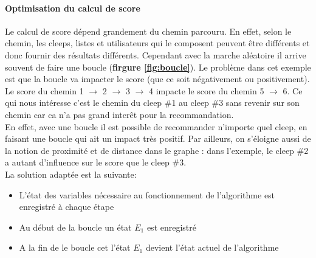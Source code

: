 \documentclass{article} %
\begin{document}
\paragraph{Optimisation du calcul de score\\}
Le calcul de score dépend grandement du chemin parcouru. En effet, selon le chemin, les cleeps, listes et utilisateurs qui le composent peuvent être différents et donc fournir des résultats différents. Cependant avec la marche aléatoire il arrive souvent de faire une boucle (\textbf{firgure \ref{fig:boucle}}). Le problème dans cet exemple est que la boucle va impacter le score (que ce soit négativement ou positivement). Le score du chemin 1 $\rightarrow$ 2 $\rightarrow$ 3 $\rightarrow$ 4 impacte le score du chemin 5 $\rightarrow$ 6. Ce qui nous intéresse c'est le chemin du cleep \#1 au cleep \#3 sans revenir sur son chemin car ca n'a pas grand interêt pour la recommandation.\\
En effet, avec une boucle il est possible de recommander n'importe quel cleep, en faisant une boucle qui ait un impact très positif. Par ailleurs, on s'éloigne aussi de la notion de proximité et de distance dans le graphe : dans l'exemple, le cleep \#2 a autant d'influence sur le score que le cleep \#3.\\
La solution adaptée est la suivante:
\begin{itemize}
	\item L'état des variables nécessaire au fonctionnement de l'algorithme est enregistré à chaque étape
	\item Au début de la boucle un état $E_{1}$ est enregistré
	\item A la fin de le boucle cet l'état $E_{1}$ devient l'état actuel de l'algorithme
\end{itemize}
\end{document}
